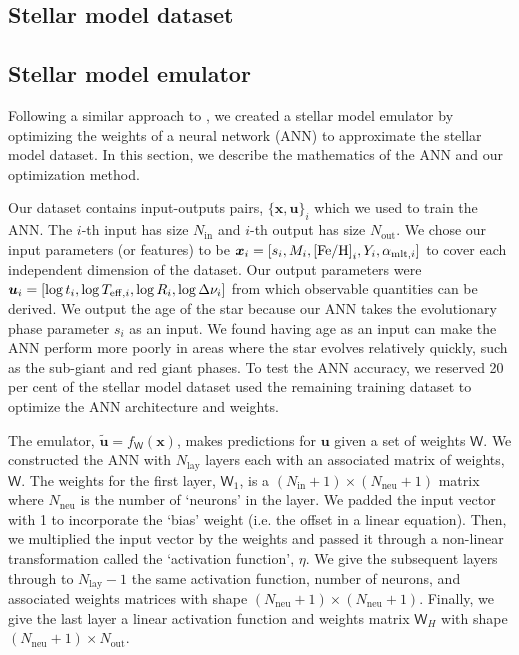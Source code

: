 \documentclass[fleqn,usenatbib]{mnras}
\renewcommand*{\vec}[1]{\boldsymbol{#1}}
\newcommand*{\mat}[1]{\boldsymbol{\mathsf{#1}}}
\newcommand{\inputs}{{x}}
\newcommand{\outputs}{{u}}
\newcommand{\pred}{{\tilde{\outputs}}}
\newcommand{\eep}{\ensuremath{s}}
\newcommand{\feh}{\ensuremath{\mathrm{[Fe/H]}}}
\newcommand{\mlt}[1][]{{\ensuremath{\alpha_{\mathrm{mlt} \ifx#1\empty \else , #1 \fi}}}}
\newcommand{\teff}[1][]{{\ensuremath{T_{\mathrm{eff} \ifx#1\empty \else , #1 \fi}}}}
\begin{document}
\subsection{Stellar model dataset}
\label{sec:grid}

\subsection{Stellar model emulator}
\label{sec:emulator}

Following a similar approach to \citet{Lyttle.Davies.ea2021}, we created a stellar model emulator by optimizing the weights of a neural network (ANN) to approximate the stellar model dataset. In this section, we describe the mathematics of the ANN and our optimization method.

Our dataset contains input-outputs pairs, \(\{\vec\inputs, \vec\outputs\}_i\) which we used to train the ANN. The \(i\)-th input has size \(N_\mathrm{in}\) and \(i\)-th output has size \(N_\mathrm{out}\). We chose our input parameters (or features) to be \(\vec\inputs_i = [\eep_i, M_i, \feh_i, Y_i, \mlt[i]]\) to cover each independent dimension of the dataset. Our output parameters were \(\vec\outputs_i = [\log t_i, \log \teff[i], \log R_i, \log \Delta\nu_i]\) from which observable quantities can be derived. We output the age of the star because our ANN takes the evolutionary phase parameter \(\eep_i\) as an input. We found having age as an input can make the ANN perform more poorly in areas where the star evolves relatively quickly, such as the sub-giant and red giant phases. To test the ANN accuracy, we reserved 20 per cent of the stellar model dataset used the remaining training dataset to optimize the ANN architecture and weights.

The emulator, \(\vec\pred = f_{\mathsf{W}}(\vec\inputs)\), makes predictions for \(\vec\outputs\) given a set of weights \(\mat W\). We constructed the ANN with \(N_\mathrm{lay}\) layers each with an associated matrix of weights, \(\mat W\). The weights for the first layer, \(\mat W_1\), is a \((N_\mathrm{in} + 1) \times (N_\mathrm{neu} + 1)\) matrix where \(N_\mathrm{neu}\) is the number of `neurons' in the layer. We padded the input vector with 1 to incorporate the `bias' weight (i.e. the offset in a linear equation). Then, we multiplied the input vector by the weights and passed it through a non-linear transformation called the `activation function', \(\eta\). We give the subsequent layers through to \(N_\mathrm{lay}-1\) the same activation function, number of neurons, and associated weights matrices with shape \((N_\mathrm{neu} + 1) \times (N_\mathrm{neu} + 1)\). Finally, we give the last layer a linear activation function and weights matrix \(\mat W_H\) with shape \((N_\mathrm{neu} + 1) \times N_\mathrm{out}\).
\end{document}
